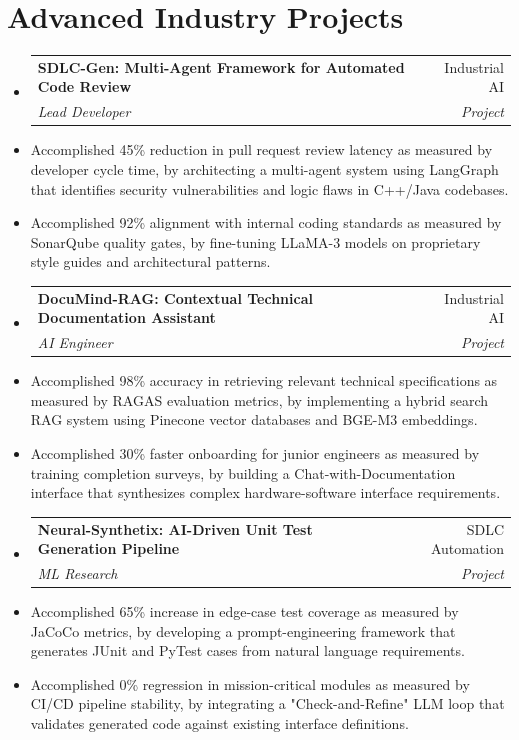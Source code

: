 \documentclass[10pt, a4paper]{article}
\makeatletter
\newcommand{\resumeItem}[1]{\item\small{#1}}
\newcommand{\resumeHeading}[4]{
  \vspace{-1pt}\item
    \begin{tabular*}{0.97\textwidth}[t]{l@{\extracolsep{\fill}}r}
      \textbf{#1} & #2 \\
      \textit{\small#3} & \textit{\small #4} \\
    \end{tabular*}\vspace{-5pt}
}
\makeatother
\begin{document}
\section{Advanced Industry Projects}
\begin{itemize}[leftmargin=0.15in, label={}]

    \resumeHeading
      {SDLC-Gen: Multi-Agent Framework for Automated Code Review}{Industrial AI}
      {Lead Developer}{Project}
      \resumeItem{Accomplished 45\% reduction in pull request review latency as measured by developer cycle time, by architecting a multi-agent system using LangGraph that identifies security vulnerabilities and logic flaws in C++/Java codebases.}
      \resumeItem{Accomplished 92\% alignment with internal coding standards as measured by SonarQube quality gates, by fine-tuning LLaMA-3 models on proprietary style guides and architectural patterns.}

    \resumeHeading
      {DocuMind-RAG: Contextual Technical Documentation Assistant}{Industrial AI}
      {AI Engineer}{Project}
      \resumeItem{Accomplished 98\% accuracy in retrieving relevant technical specifications as measured by RAGAS evaluation metrics, by implementing a hybrid search RAG system using Pinecone vector databases and BGE-M3 embeddings.}
      \resumeItem{Accomplished 30\% faster onboarding for junior engineers as measured by training completion surveys, by building a Chat-with-Documentation interface that synthesizes complex hardware-software interface requirements.}

    \resumeHeading
      {Neural-Synthetix: AI-Driven Unit Test Generation Pipeline}{SDLC Automation}
      {ML Research}{Project}
      \resumeItem{Accomplished 65\% increase in edge-case test coverage as measured by JaCoCo metrics, by developing a prompt-engineering framework that generates JUnit and PyTest cases from natural language requirements.}
      \resumeItem{Accomplished 0\% regression in mission-critical modules as measured by CI/CD pipeline stability, by integrating a "Check-and-Refine" LLM loop that validates generated code against existing interface definitions.}

\end{itemize}

\end{document}
